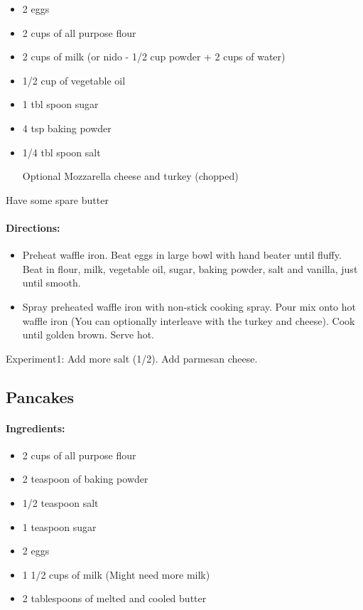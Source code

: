 \documentclass{article}
\begin{document}
\begin{itemize}
	\item 2 eggs
	\item 2 cups of all purpose flour
	\item 2 cups of milk (or nido - 1/2 cup powder + 2 cups of water)
	\item 1/2 cup of vegetable oil
	\item 1 tbl spoon sugar
	\item 4 tsp baking powder
	\item 1/4 tbl spoon salt
	\item [Optional] Mozzarella cheese and turkey (chopped)
\end{itemize}

Have some spare butter

\paragraph{Directions:}
\begin{itemize}
	\item Preheat waffle iron. Beat eggs in large bowl with hand beater until fluffy. Beat in flour, milk, vegetable oil, sugar, baking powder, salt and vanilla, just until smooth.
	\item Spray preheated waffle iron with non-stick cooking spray. Pour mix onto hot waffle iron (You can optionally interleave with the turkey and cheese). Cook until golden brown. Serve hot.
\end{itemize}

Experiment1: Add more salt (1/2). Add parmesan cheese.

\subsection{Pancakes}

\paragraph{Ingredients:}

\begin{itemize}
	\item 2 cups of all purpose flour 
	\item 2 teaspoon of baking powder 
	\item 1/2 teaspoon salt 
	\item 1 teaspoon sugar 
	\item 2 eggs 
	\item 1 1/2 cups of milk (Might need more milk)
	\item 2 tablespoons of melted and cooled butter
\end{itemize}
\end{document}

